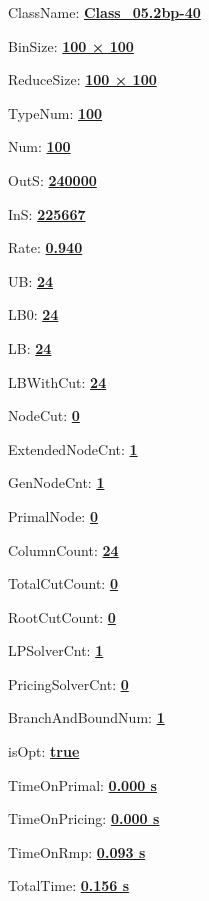 \documentclass[11pt]{article}
\begin{document}
\pagestyle{empty}


ClassName: \underline{\textbf{Class_05.2bp-40}}
\par
BinSize: \underline{\textbf{100 × 100}}
\par
ReduceSize: \underline{\textbf{100 × 100}}
\par
TypeNum: \underline{\textbf{100}}
\par
Num: \underline{\textbf{100}}
\par
OutS: \underline{\textbf{240000}}
\par
InS: \underline{\textbf{225667}}
\par
Rate: \underline{\textbf{0.940}}
\par
UB: \underline{\textbf{24}}
\par
LB0: \underline{\textbf{24}}
\par
LB: \underline{\textbf{24}}
\par
LBWithCut: \underline{\textbf{24}}
\par
NodeCut: \underline{\textbf{0}}
\par
ExtendedNodeCnt: \underline{\textbf{1}}
\par
GenNodeCnt: \underline{\textbf{1}}
\par
PrimalNode: \underline{\textbf{0}}
\par
ColumnCount: \underline{\textbf{24}}
\par
TotalCutCount: \underline{\textbf{0}}
\par
RootCutCount: \underline{\textbf{0}}
\par
LPSolverCnt: \underline{\textbf{1}}
\par
PricingSolverCnt: \underline{\textbf{0}}
\par
BranchAndBoundNum: \underline{\textbf{1}}
\par
isOpt: \underline{\textbf{true}}
\par
TimeOnPrimal: \underline{\textbf{0.000 s}}
\par
TimeOnPricing: \underline{\textbf{0.000 s}}
\par
TimeOnRmp: \underline{\textbf{0.093 s}}
\par
TotalTime: \underline{\textbf{0.156 s}}
\par
\newpage


\end{document}
